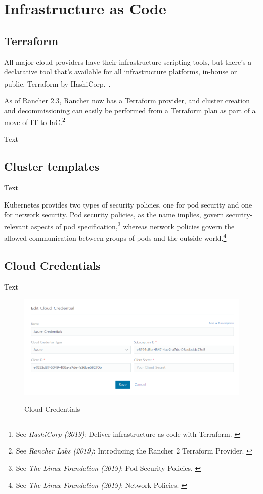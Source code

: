 %
%

\pagebreak
\section{Infrastructure as Code}

\onehalfspacing

\subsection{Terraform}

All major cloud providers have their infrastructure scripting tools, but there's a declarative tool that's available for all infrastructure platforms, in-house or public, Terraform by HashiCorp.\footnote{See \textit{HashiCorp (2019)}: Deliver infrastructure as code with Terraform. \cite{terraform}}.

As of Rancher 2.3, Rancher now has a Terraform provider, and cluster creation and decommissioning can easily be performed from a Terraform plan as part of a move of IT to IaC.\footnote{See \textit{Rancher Labs (2019)}: Introducing the Rancher 2 Terraform Provider. \cite{terraformProvider}}

Text

\subsection{Cluster templates}

Text

Kubernetes provides two types of security policies, one for pod security and one for network security. Pod security policies, as the name implies, govern security-relevant aspects of pod specification,\footnote{See \textit{The Linux Foundation (2019)}: Pod Security Policies. \cite{podSecurity}} whereas network policies govern the allowed communication between groups of pods and the outside world.\footnote{See \textit{The Linux Foundation (2019)}: Network Policies. \cite{netSecurity}}

\subsection{Cloud Credentials}

Text 

\begin{figure}[H]
\centering
\caption {Cloud Credentials}
\includegraphics[width=\linewidth]{images/cloud-credentials.png}
\label{fig:cloudCredentials}
\end{figure}

